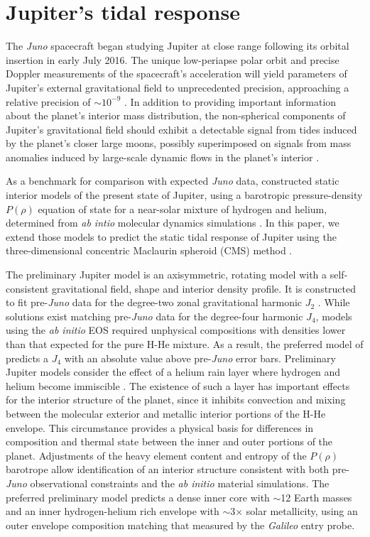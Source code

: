\section{Jupiter's tidal response} \label{jupiter}

The \textit{Juno} spacecraft began studying Jupiter at close range following its
orbital insertion in early July 2016. The unique low-periapse polar orbit and precise
Doppler measurements of the spacecraft's acceleration will yield parameters of
Jupiter's external gravitational field to unprecedented precision, approaching a
relative precision of $\sim 10^{-9}$ \citep{kaspi2010}. In addition to providing
important information about the planet's interior mass distribution, the
non-spherical components of Jupiter's gravitational field should exhibit a detectable
signal from tides induced by the planet's closer large moons, possibly superimposed
on signals from mass anomalies induced by large-scale dynamic flows in the planet's
interior \citep{cao2015,kaspi2010,kaspi2013}.

As a benchmark for comparison with expected \textit{Juno} data, \citet{hubbard2016}
constructed static interior models of the present state of Jupiter, using a
barotropic pressure-density $P(\rho)$ equation of state for a near-solar mixture of
hydrogen and helium, determined from \textit{ab intio} molecular dynamics simulations
\citep{militzer2013a,militzer2013b}. In this paper, we extend those models to predict
the static tidal response of Jupiter using the three-dimensional concentric Maclaurin
spheroid (CMS) method \citep{wahl2016}.

The \citet{hubbard2016} preliminary Jupiter model is an axisymmetric, rotating model
with a self-consistent gravitational field, shape and interior density profile. It is
constructed to fit pre-\textit{Juno} data for the degree-two zonal gravitational
harmonic $J_2$ \citep{jacobson2003}. While solutions exist matching pre-\textit{Juno}
data for the degree-four harmonic $J_4$, models using the \textit{ab initio} EOS required unphysical
compositions with densities lower than that expected for the pure H-He mixture. As a result, the
preferred model of \citet{hubbard2016} predicts a $J_4$ with an absolute value above
pre-\textit{Juno} error bars. Preliminary Jupiter models consider the effect of a
helium rain layer where hydrogen and helium become immiscible \citep{stevenson1977a}.
The existence of such a layer has important effects for the interior structure of the
planet, since it inhibits convection and mixing between the molecular exterior and
metallic interior portions of the H-He envelope. This circumstance provides a
physical basis for differences in composition and thermal state between the inner and
outer portions of the planet.  Adjustments of the heavy element content and entropy
of the $P(\rho)$ barotrope allow identification of an interior structure consistent
with both pre-\textit{Juno} observational constraints and the \textit{ab initio}
material simulations. The preferred preliminary model predicts a dense inner core
with $\sim$12 Earth masses and an inner hydrogen-helium rich envelope with
$\sim$3$\times$ solar metallicity, using an outer envelope composition matching that
measured by the \textit{Galileo} entry probe.

